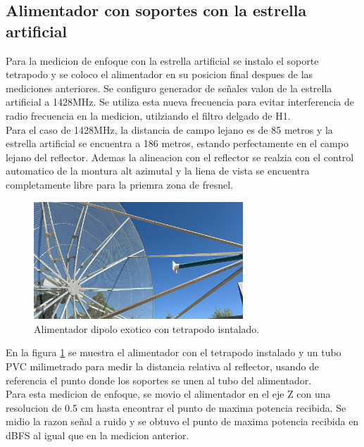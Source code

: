 \subsection{Alimentador con soportes con la estrella artificial}

Para la medicion de enfoque con la estrella artificial se instalo el soporte tetrapodo y se coloco el alimentador en su posicion final despues de las mediciones anteriores. Se configuro generador de señales valon de la estrella artificial a 1428MHz. Se utiliza esta nueva frecuencia para evitar interferencia de radio frecuencia en la medicion, utilziando el filtro delgado de H1.\\

Para el caso de 1428MHz, la distancia de campo lejano es de 85 metros y la estrella artificial se encuentra a 186 metros, estando perfectamente en el campo lejano del reflector. Ademas la alineacion con el reflector se realzia con el control automatico de la montura alt azimutal y la liena de vista se encuentra completamente libre para la priemra zona de fresnel.\\

\begin{figure}
    \centering
    \includegraphics[width=0.7\textwidth]{img/feed_focus}
    \caption{Alimentador dipolo exotico con tetrapodo isntalado.}
    \label{fig:enfoque2}
\end{figure}

En la figura \ref{fig:enfoque2} se muestra el alimentador con el tetrapodo instalado y un tubo PVC milimetrado para medir la distancia relativa al reflector, usando de referencia el punto donde los soportes se unen al tubo del alimentador.\\

Para esta medicion de enfoque, se movio el alimentador en el eje Z con una resolucion de 0.5 cm hasta encontrar el punto de maxima potencia recibida. Se midio la razon señal a ruido y se obtuvo el punto de maxima potencia recibida en dBFS al igual que en la medicion anterior.\\

